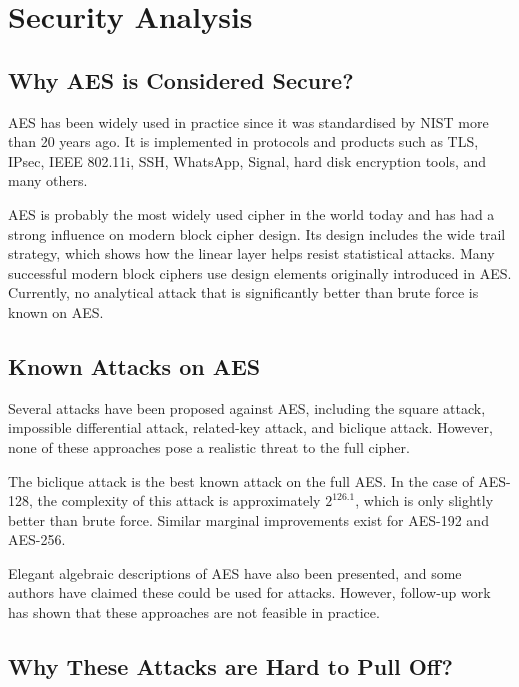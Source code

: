 \section{Security Analysis}

\subsection{Why AES is Considered Secure?}

AES has been widely used in practice since it was standardised by NIST more than 20 years ago. 
It is implemented in protocols and products such as TLS, IPsec, IEEE 802.11i, SSH, WhatsApp, Signal, hard disk encryption tools, and many others.\newline

\noindent AES is probably the most widely used cipher in the world today and has had a strong influence on modern block cipher design. 
Its design includes the wide trail strategy, which shows how the linear layer helps resist statistical attacks. 
Many successful modern block ciphers use design elements originally introduced in AES. 
Currently, no analytical attack that is significantly better than brute force is known on AES.

\subsection{Known Attacks on AES}

Several attacks have been proposed against AES, including the square attack, 
impossible differential attack, related-key attack, and biclique attack. 
However, none of these approaches pose a realistic threat to the full cipher.\newline

\noindent The biclique attack is the best known attack on the full AES. 
In the case of AES-128, the complexity of this attack is approximately $2^{126.1}$, 
which is only slightly better than brute force. 
Similar marginal improvements exist for AES-192 and AES-256.\newline

\noindent Elegant algebraic descriptions of AES have also been presented, 
and some authors have claimed these could be used for attacks. 
However, follow-up work has shown that these approaches are not feasible in practice.

\subsection{Why These Attacks are Hard to Pull Off?}


